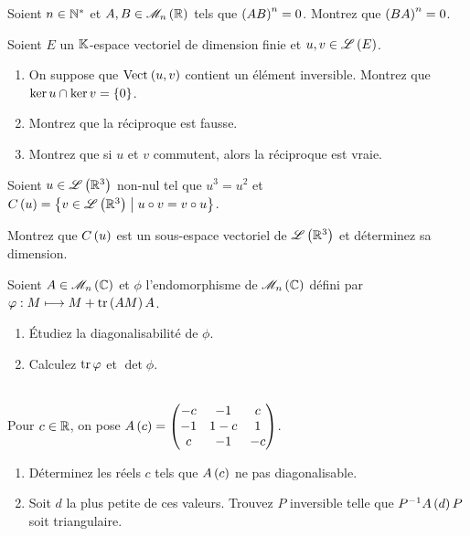 \begin{exo}
Soient \(n\in\mathbb{N}^*\) et \(A,B\in\M{n}[\R]\) tels que \(\left(AB\right)^n=0\). Montrez que \(\left(BA\right)^n=0\).
\end{exo}



\begin{exo}
Soient \(E\) un \(\mathbb{K}\)-espace vectoriel de dimension finie et \(u,v\in\mathscr{L}\left(E\right)\).

\begin{enumerate}
    \item On suppose que \(\Vect{u,v}\) contient un élément inversible. Montrez que \(\ker u\cap\ker v=\left\lbrace0\right\rbrace\). \\
    \item Montrez que la réciproque est fausse. \\
    \item Montrez que si \(u\) et \(v\) commutent, alors la réciproque est vraie.
\end{enumerate}
\end{exo}



\begin{exo}
Soient \(u\in\mathscr{L}\left(\mathbb{R}^3\right)\) non-nul tel que \(u^3=u^2\) et \(C\left(u\right)=\left\lbrace v\in\mathscr{L}\left(\mathbb{R}^3\right)\;\middle|\; u\circ v=v\circ u\right\rbrace\).

Montrez que \(C\left(u\right)\) est un sous-espace vectoriel de \(\mathscr{L}\left(\mathbb{R}^3\right)\) et déterminez sa dimension.
\end{exo}



\begin{exo}
Soient \(A\in\M{n}[\C]\) et \(\phi\) l'endomorphisme de \(\M{n}[\C]\) défini par \(\varphi:M\longmapsto M+\operatorname{tr}\left(AM\right)A\).

\begin{enumerate}
    \item Étudiez la diagonalisabilité de \(\phi\). \\
    \item Calculez \(\operatorname{tr}\varphi\) et \(\det\phi\).
\end{enumerate}
\end{exo}



\begin{exo}~\\
Pour \(c\in\mathbb{R}\), on pose \(A\left(c\right)=\begin{pmatrix}
-c & -1 & c \\
-1 & 1-c & 1 \\
c & -1 & -c
\end{pmatrix}\).

\begin{enumerate}
    \item Déterminez les réels \(c\) tels que \(A\left(c\right)\) ne pas diagonalisable. \\
    \item Soit \(d\) la plus petite de ces valeurs. Trouvez \(P\) inversible telle que \(P^{-1} A\left(d\right)P\) soit triangulaire.
\end{enumerate}
\end{exo}



